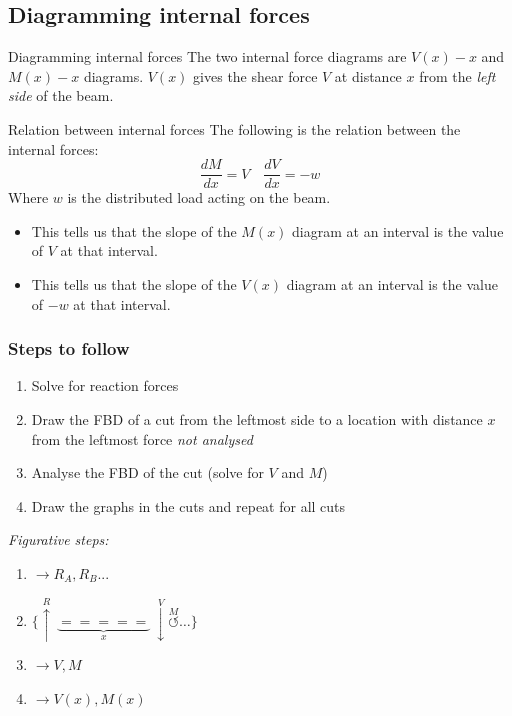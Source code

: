 \documentclass{article}
\begin{document}
\subsection{Diagramming internal forces}
\begin{definition}
    {Diagramming internal forces}
    The two internal force diagrams are $V(x)-x$ and $M(x)-x$ diagrams. $V(x)$ gives the shear force $V$ at distance $x$ from the \emph{left side} of the beam.
\end{definition}
\begin{theorem}
    {Relation between internal forces}
    The following is the relation between the internal forces:
    \[\frac{dM}{dx}=V\quad \frac{dV}{dx}=-w\]
    Where $w$ is the distributed load acting on the beam.
    \begin{itemize}
        \item This tells us that the slope of the $M(x)$ diagram at an interval is the value of $V$ at that interval.
        \item This tells us that the slope of the $V(x)$ diagram at an interval is the value of $-w$ at that interval.
    \end{itemize}
\end{theorem}

\subsubsection{Steps to follow}
\begin{minipage}{0.6\textwidth}
    \begin{enumerate}
        \item Solve for reaction forces
        \item Draw the FBD of a cut from the leftmost side to a location with distance $x$ from the leftmost force \emph{not analysed}
        \item Analyse the FBD of the cut (solve for $V$ and $M$)
        \item Draw the graphs in the cuts and repeat for all cuts
    \end{enumerate}
\end{minipage}
\hfill
\begin{minipage}{0.35\textwidth}
    \emph{Figurative steps:}
    \begin{enumerate}
        \item $\to R_A, R_B...$
        \item $\{\overset{R}{\uparrow}\ \underbrace{=====}_x\ \overset{V}{\downarrow}\overset{M}{\circlearrowleft}\dots\}$
        \item $\to V, M$
        \item $\to V(x), M(x)$
    \end{enumerate}
\end{minipage}
\end{document}
